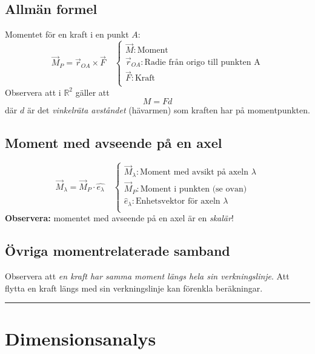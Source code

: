 \documentclass{article}
\newenvironment{ankiflashcard}[1][ ]{}{}
\newcommand{\ruler}{
\rule{0.5\textwidth}{0.5pt}
}
\begin{document}
\begin{paracol}{2}
\begin{ankiflashcard}
\subsection{Allmän formel}
Momentet för en kraft i en punkt $A$:
$$
\vec M_P = \vec r_{OA} \times \vec F\quad\left\{\begin{array}{l}\vec M: \text{Moment} \\\vec r_{OA}: \text{Radie från origo till punkten A} \\\vec F: \text{Kraft} \\\end{array}\right.$$
Observera att i $\mathbb R^2$ gäller att
$$
M = Fd
$$
där $d$ är det \textit{vinkelräta avståndet} (hävarmen) som kraften har på momentpunkten.

    
\end{ankiflashcard}

\begin{ankiflashcard}
    
\subsection{Moment med avseende på en axel}
$$
\vec M_{\lambda} = \vec M_P \cdot \hat {e_{\lambda}}\quad\left\{\begin{array}{l}\vec M_{\lambda}: \text{Moment med avsikt på axeln }\lambda \\\vec M_P: \text{Moment i punkten (se ovan)} \\\hat e_\lambda: \text{Enhetsvektor för axeln } \lambda \\\end{array}\right.$$
\textbf{Observera: } momentet med avseende på en axel är en \textit{skalär}!
\end{ankiflashcard}

\begin{ankiflashcard}
\subsection{Övriga momentrelaterade samband}
Observera att \textit{en kraft har samma moment längs hela sin verkningslinje}. Att flytta en kraft längs med sin verkningslinje kan förenkla beräkningar.
\end{ankiflashcard}
\ruler
\section{Dimensionsanalys}

\end{paracol}
\end{document}
